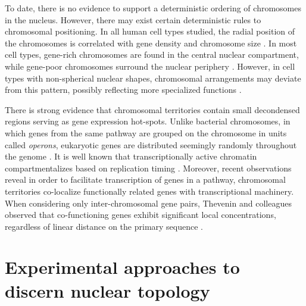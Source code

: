 
To date, there is no evidence to support a deterministic ordering of chromosomes in the nucleus.  However, there may exist certain deterministic rules to
chromosomal positioning.  In all human cell types studied, the radial position of the chromosomes is correlated with gene density and chromosome
size \citep{sun2000,bolzer2005}.  In most cell types, gene-rich chromosomes are found in the central nuclear compartment, while gene-poor
chromosomes surround the nuclear periphery \citep{boyle2001,kozubek2005}.  However, in cell types with non-spherical nuclear shapes, chromosomal
arrangements may deviate from this pattern, possibly reflecting more specialized functions \citep{bolzer2005}.

There is strong evidence that chromosomal territories contain small decondensed regions serving as gene expression hot-spots.  Unlike bacterial chromosomes,
in which genes from the same pathway are grouped on the chromosome in units called \textit{operons}, eukaryotic genes are distributed seemingly randomly
throughout the genome \citep{jacob1961}.  It is well known that transcriptionally active chromatin compartmentalizes based on replication
timing \citep{ferreira1997,sadoni1999,thevenin2014}.  Moreover, recent observations reveal in order to facilitate transcription of genes in
a pathway, chromosomal territories co-localize functionally related genes with transcriptional machinery.  When considering only inter-chromosomal gene
pairs, Thevenin and colleagues observed that co-functioning genes exhibit significant local concentrations, regardless
of linear distance on the primary sequence \citep{thevenin2014}.



\section*{Experimental approaches to discern nuclear topology}

